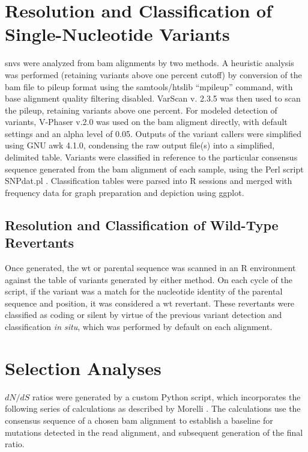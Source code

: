 \section{Resolution and Classification of Single-Nucleotide Variants}
\Glspl{snv} were analyzed from \gls{bam} alignments by two methods. A heuristic analysis was performed (retaining variants above one percent cutoff) by conversion of the \gls{bam} file to pileup format using the samtools/htslib “mpileup” command, with base alignment quality filtering disabled. VarScan v. 2.3.5 was then used to scan the pileup, retaining variants above one percent. For modeled detection of variants, V-Phaser v.2.0 was used on the \gls{bam} aligment directly, with default settings and an alpha level of 0.05. Outputs of the variant callers were simplified using GNU awk 4.1.0, condensing the raw output file(s) into a simplified, delimited table. Variants were classified in reference to the particular consensus sequence generated from the \gls{bam} alignment of each sample, using the Perl script SNPdat.pl \parencite{Doran:2013df}. Classification tables were parsed into R sessions and merged with frequency data for graph preparation and depiction using ggplot. 

\subsection{Resolution and Classification of Wild-Type Revertants}
Once generated, the \gls{wt} or parental sequence was scanned in an R environment against the table of variants generated by either method. On each cycle of the script, if the variant was a match for the nucleotide identity of the parental sequence and position, it was considered a \gls{wt} revertant. These revertants were classified as coding or silent by virtue of the previous variant detection and classification \emph{in situ}, which was performed by default on each alignment.

\section{Selection Analyses}
$dN/dS$ ratios were generated by a custom Python script, which incorporates the following series of calculations as described by Morelli \parencite{Morelli:2013jl}. The calculations use the consensus sequence of a chosen \gls{bam} alignment to establish a baseline for mutations detected in the read alignment, and subsequent
generation of the final ratio.

